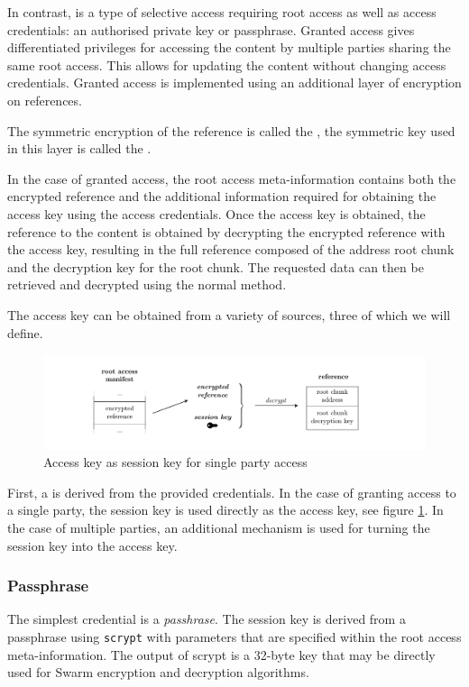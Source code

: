 In contrast,  is a type of selective access requiring root access as well as access credentials: an authorised private key or passphrase. Granted access gives differentiated privileges for accessing the content by multiple parties sharing the same root access. This allows for updating the content without changing access credentials. Granted access is implemented using an additional layer of encryption on references.

The symmetric encryption of the reference is called the , the symmetric key used in this layer is called the .

In the case of granted access, the root access meta-information contains both the encrypted reference and the additional information required for obtaining the access key using the access credentials. Once the access key is obtained, the reference to the content is obtained by decrypting the encrypted reference with the access key, resulting in the full reference composed of the address root chunk and the decryption key for the root chunk. The requested data can then be retrieved and decrypted using the normal method.

The access key can be obtained from a variety of sources, three of which we will define.

\begin{figure}[htbp]
\centering
\includegraphics[width=\textwidth]{fig/access-control-single-party.pdf}
\caption[Access key as session key for single party access  \statusyellow]{Access key as session key for single party access}
\label{fig:access-control-single-party}
\end{figure}

First, a  is derived from the provided credentials. In the case of granting access to a single party, the session key is used directly as the access key, see figure \ref{fig:access-control-single-party}. In the case of multiple parties, an additional mechanism is used for turning the session key into the access key.

\subsubsection{Passphrase}
The simplest credential is a \emph{passhrase}. The session key is derived from a passphrase using \lstinline{scrypt} with parameters that are specified within the root access meta-information. The output of scrypt is a 32-byte key that may be directly used for Swarm encryption and decryption algorithms.

